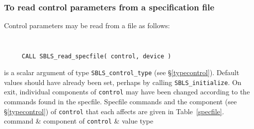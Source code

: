 \documentclass{galahad}
\newcommand{\packagename}{SBLS}
\begin{document}
\subsubsection{To read control parameters from a specification file}
\label{readspec}

Control parameters may be read from a file as follows:
\hskip0.5in

\def\baselinestretch{0.8}
{\tt
\begin{verbatim}
     CALL SBLS_read_specfile( control, device )
\end{verbatim}
}
\def\baselinestretch{1.0}

\begin{description}
 is a scalar \intentinout argument of type
{\tt \packagename\_control\_type}
(see \S\ref{typecontrol}).
Default values should have already been set, perhaps by calling
{\tt \packagename\_initialize}.
On exit, individual components of {\tt control} may have been changed
according to the commands found in the specfile. Specfile commands and
the component (see \S\ref{typecontrol}) of {\tt control}
that each affects are given in Table~\ref{specfile}.
\hline
  command & component of {\tt control} & value type \\
\hline


\end{description}
\end{document}
